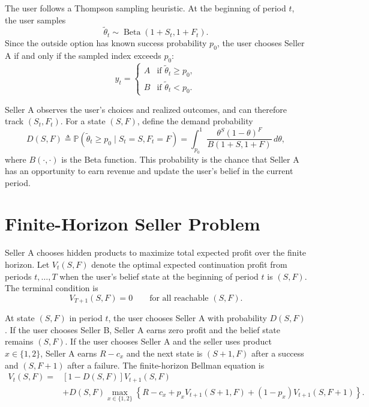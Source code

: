 \documentclass[opre]{informs3}
\newcommand{\Pb}{\mathbb{P}}
\begin{document}
The user follows a Thompson sampling heuristic. At the beginning of period $t$,
the user samples
\begin{equation}
    \tilde{\theta}_t\sim\operatorname{Beta}(1+S_t,1+F_t).
\end{equation}
Since the outside option has known success probability $p_0$, the user chooses
Seller A if and only if the sampled index exceeds $p_0$:
\begin{equation}
    y_t=
    \begin{cases}
        A & \text{if } \tilde{\theta}_t\geq p_0,\\
        B & \text{if } \tilde{\theta}_t<p_0.
    \end{cases}
    \label{eq:user-policy}
\end{equation}

Seller A observes the user's choices and realized outcomes, and can therefore
track $(S_t,F_t)$. For a state $(S,F)$, define the demand probability
\begin{equation}
    D(S,F)
    \triangleq
    \Pb(\tilde{\theta}_t\geq p_0\mid S_t=S,F_t=F)
    =
    \int_{p_0}^{1}
    \frac{\theta^S(1-\theta)^F}{B(1+S,1+F)}\,d\theta,
    \label{eq:demand-probability}
\end{equation}
where $B(\cdot,\cdot)$ is the Beta function. This probability is the chance that
Seller A has an opportunity to earn revenue and update the user's belief in the
current period.

\section{Finite-Horizon Seller Problem}

Seller A chooses hidden products to maximize total expected profit over the
finite horizon. Let $V_t(S,F)$ denote the optimal expected continuation profit
from periods $t,\ldots,T$ when the user's belief state at the beginning of period
$t$ is $(S,F)$. The terminal condition is
\begin{equation}
    V_{T+1}(S,F)=0
    \qquad\text{for all reachable }(S,F).
    \label{eq:terminal-condition}
\end{equation}

At state $(S,F)$ in period $t$, the user chooses Seller A with probability
$D(S,F)$. If the user chooses Seller B, Seller A earns zero profit and the belief
state remains $(S,F)$. If the user chooses Seller A and the seller uses product
$x\in\{1,2\}$, Seller A earns $R-c_x$ and the next state is $(S+1,F)$ after a
success and $(S,F+1)$ after a failure. The finite-horizon Bellman equation is
\begin{equation}
\begin{aligned}
    V_t(S,F)
    =
    &[1-D(S,F)]V_{t+1}(S,F)\\
    &+
    D(S,F)
    \max_{x\in\{1,2\}}
    \left\{
        R-c_x
        +p_xV_{t+1}(S+1,F)
        +(1-p_x)V_{t+1}(S,F+1)
    \right\}.
\end{aligned}
\label{eq:finite-bellman}
\end{equation}
\end{document}
